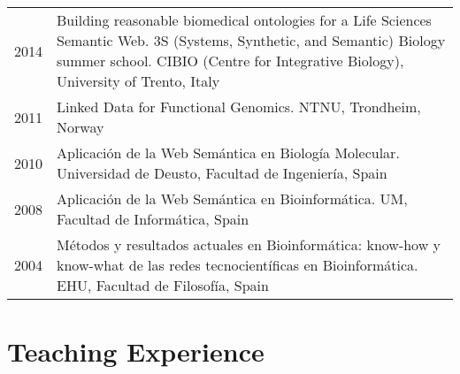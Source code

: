 \documentclass[11pt,fullpage]{article}
\begin{document}
\begin{longtable}{p{0.5in}|p{5.5in}}


2014 & Building reasonable biomedical ontologies for a Life Sciences Semantic Web. 3S (Systems, Synthetic, and Semantic) Biology summer school. CIBIO (Centre for Integrative Biology), University of Trento, Italy \\

2011 & Linked Data for Functional Genomics. NTNU, Trondheim, Norway \\

2010 & Aplicaci\'on de la Web Sem\'antica en Biolog\'ia Molecular. Universidad de Deusto, Facultad de Ingenier\'ia, Spain \\

2008 & Aplicaci\'on de la Web Sem\'antica en Bioinform\'atica. UM, Facultad de Inform\'atica, Spain \\

2004 & M\'etodos y resultados actuales en Bioinform\'atica: know-how y know-what de las redes tecnocient\'ificas en Bioinform\'atica. EHU, Facultad de Filosof\'ia, Spain

\end{longtable}




\section*{Teaching Experience}
\end{document}
